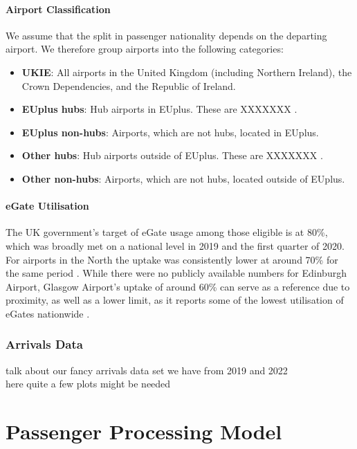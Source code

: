 \documentclass[10pt]{article}
\begin{document}
\paragraph{Airport Classification}
We assume that the split in passenger nationality depends on the departing airport. We therefore group airports into the following categories: 
\begin{itemize}
    \item \textbf{UKIE}: All airports in the United Kingdom (including Northern Ireland), the Crown Dependencies, and the Republic of Ireland.
    \item \textbf{EUplus hubs}: Hub airports in EUplus. These are XXXXXXX \cite{mega_hubs}.
    \item \textbf{EUplus non-hubs}: Airports, which are not hubs, located in EUplus.
    \item \textbf{Other hubs}: Hub airports outside of EUplus. These are XXXXXXX \cite{mega_hubs}.
    \item \textbf{Other non-hubs}: Airports, which are not hubs, located outside of EUplus.
\end{itemize}

\paragraph{eGate Utilisation}
The UK government's target of eGate usage among those eligible is at 80\%, which was broadly met on a national level in 2019 and the first quarter of 2020. For airports in the North the uptake was consistently lower at around 70\% for the same period \cite{Inspection_eGates}. While there were no publicly available numbers for Edinburgh Airport, Glasgow Airport's uptake of around 60\% can serve as a reference due to proximity, as well as a lower limit, as it reports some of the lowest utilisation of eGates nationwide \cite{Inspection_eGates}. 


\subsubsection{Arrivals Data}
talk about our fancy arrivals data set we have from 2019 and 2022 \\
here quite a few plots might be needed 


\section{Passenger Processing Model}
\end{document}
